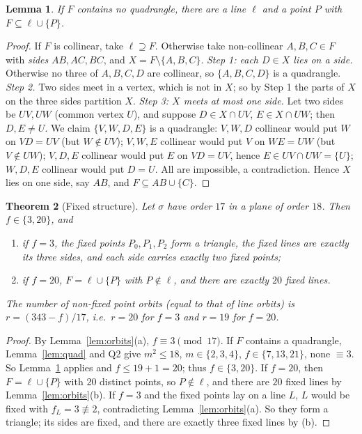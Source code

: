 \documentclass[11pt,a4paper]{article}
\newtheorem{theorem}{Theorem}[section]
\newtheorem{lemma}[theorem]{Lemma}
\theoremstyle{definition}
\begin{document}
\begin{lemma}\label{lem:noquad}
If $F$ contains no quadrangle, there are a line $\ell$ and a point $P$ with $F\subseteq\ell\cup\{P\}$.
\end{lemma}
\begin{proof}
If $F$ is collinear, take $\ell\supseteq F$. Otherwise take non-collinear $A,B,C\in F$ with \emph{sides} $AB,AC,BC$, and $X=F\setminus\{A,B,C\}$.
\emph{Step 1: each $D\in X$ lies on a side.} Otherwise no three of $A,B,C,D$ are collinear, so $\{A,B,C,D\}$ is a quadrangle.
\emph{Step 2.} Two sides meet in a vertex, which is not in $X$; so by Step 1 the parts of $X$ on the three sides partition $X$.
\emph{Step 3: $X$ meets at most one side.} Let two sides be $UV,UW$ (common vertex $U$), and suppose $D\in X\cap UV$, $E\in X\cap UW$; then $D,E\ne U$. We claim $\{V,W,D,E\}$ is a quadrangle: $V,W,D$ collinear would put $W$ on $VD=UV$ (but $W\notin UV$); $V,W,E$ collinear would put $V$ on $WE=UW$ (but $V\notin UW$); $V,D,E$ collinear would put $E$ on $VD=UV$, hence $E\in UV\cap UW=\{U\}$; $W,D,E$ collinear would put $D=U$. All are impossible, a contradiction.
Hence $X$ lies on one side, say $AB$, and $F\subseteq AB\cup\{C\}$.
\end{proof}

\begin{theorem}[Fixed structure]\label{thm:fixed}
Let $\sigma$ have order $17$ in a plane of order $18$. Then $f\in\{3,20\}$, and
\begin{enumerate}[label=(\roman*),itemsep=0pt]
\item if $f=3$, the fixed points $P_0,P_1,P_2$ form a triangle, the fixed lines are exactly its three sides, and each side carries exactly two fixed points;
\item if $f=20$, $F=\ell\cup\{P\}$ with $P\notin\ell$, and there are exactly $20$ fixed lines.
\end{enumerate}
The number of non-fixed point orbits (equal to that of line orbits) is $r=(343-f)/17$, i.e.\ $r=20$ for $f=3$ and $r=19$ for $f=20$.
\end{theorem}
\begin{proof}
By Lemma~\ref{lem:orbits}(a), $f\equiv3\pmod{17}$. If $F$ contains a quadrangle, Lemma~\ref{lem:quad} and Q2 give $m^2\le18$, $m\in\{2,3,4\}$, $f\in\{7,13,21\}$, none $\equiv3$. So Lemma~\ref{lem:noquad} applies and $f\le19+1=20$; thus $f\in\{3,20\}$.
If $f=20$, then $F=\ell\cup\{P\}$ with $20$ distinct points, so $P\notin\ell$, and there are $20$ fixed lines by Lemma~\ref{lem:orbits}(b).
If $f=3$ and the fixed points lay on a line $L$, $L$ would be fixed with $f_L=3\not\equiv2$, contradicting Lemma~\ref{lem:orbits}(a). So they form a triangle; its sides are fixed, and there are exactly three fixed lines by (b).
\end{proof}
\end{document}

